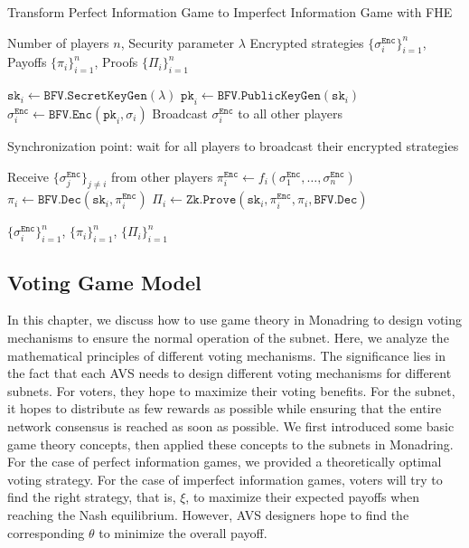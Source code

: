 \documentclass[11pt]{article}
\begin{document}
\begin{algorithm}
  \caption{Transform Perfect Information Game to Imperfect Information Game with FHE}
  \label{alg:perfect2imperfect}
  \begin{algorithmic}[1]
  \Require Number of players $n$, Security parameter $\lambda$
  \Ensure Encrypted strategies $\{\sigma^\texttt{Enc}_i\}_{i=1}^n$, Payoffs $\{\pi_i\}_{i=1}^n$, Proofs $\{\Pi_i\}_{i=1}^n$
  
      \State $\texttt{sk}_i \gets \texttt{BFV.SecretKeyGen}(\lambda)$
      \State $\texttt{pk}_i \gets \texttt{BFV.PublicKeyGen}(\texttt{sk}_i)$
      \State $\sigma^\texttt{Enc}_i \gets \texttt{BFV.Enc}(\texttt{pk}_i, \sigma_i)$
      \State Broadcast $\sigma^\texttt{Enc}_i$ to all other players
  \EndFor
  
  \State Synchronization point: wait for all players to broadcast their encrypted strategies
  
      \State Receive $\{\sigma^\texttt{Enc}_j\}_{j \neq i}$ from other players
      \State $\pi^\texttt{Enc}_i \gets f_i(\sigma^\texttt{Enc}_1, \ldots, \sigma^\texttt{Enc}_n)$ 
      \State $\pi_i \gets \texttt{BFV.Dec}(\texttt{sk}_i, \pi^\texttt{Enc}_i)$
      \State $\Pi_i \gets \texttt{Zk.Prove}(\texttt{sk}_i, \pi^\texttt{Enc}_i, \pi_i, \texttt{BFV.Dec})$
  \EndFor
  
  \State \Return $\{\sigma^\texttt{Enc}_i\}_{i=1}^n$, $\{\pi_i\}_{i=1}^n$, $\{\Pi_i\}_{i=1}^n$
  \end{algorithmic}
  \end{algorithm}


  \subsection{Voting Game Model}
  \label{sec:voting_game}
  In this chapter, we discuss how to use game theory in Monadring to design voting mechanisms to ensure the normal operation of the subnet. Here, we analyze the mathematical principles of different voting mechanisms. The significance lies in the fact that each AVS needs to design different voting mechanisms for different subnets. For voters, they hope to maximize their voting benefits. For the subnet, it hopes to distribute as few rewards as possible while ensuring that the entire network consensus is reached as soon as possible. We first introduced some basic game theory concepts, then applied these concepts to the subnets in Monadring. For the case of perfect information games, we provided a theoretically optimal voting strategy. For the case of imperfect information games, voters will try to find the right strategy, that is, $\xi$, to maximize their expected payoffs when reaching the Nash equilibrium. However, AVS designers hope to find the corresponding $\theta$ to minimize the overall payoff.
\end{document}
